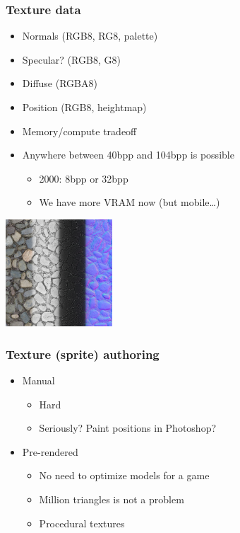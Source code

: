 \documentclass{beamer}
\begin{document}
\begin{frame}\frametitle{Texture data}

\begin{itemize}
\item
  Normals (RGB8, RG8, palette)
\item
  Specular? (RGB8, G8)
\item
  Diffuse (RGBA8)
\item
  Position (RGB8, heightmap)
\item
  Memory/compute tradeoff
\item
  Anywhere between 40bpp and 104bpp is possible

  \begin{itemize}
  \item
    2000: 8bpp or 32bpp
  \item
    We have more VRAM now (but mobile\ldots{})
  \end{itemize}
\end{itemize}
\begin{center}
\includegraphics[width=0.3\textwidth]{maps.jpg}
\end{center}

\end{frame}

\begin{frame}\frametitle{Texture (sprite) authoring}

\begin{itemize}
\item
  Manual

  \begin{itemize}
  \item
    Hard
  \item
    Seriously? Paint positions in Photoshop?
  \end{itemize}
\item
  Pre-rendered

  \begin{itemize}
  \item
    No need to optimize models for a game
  \item
    Million triangles is not a problem
  \item
    Procedural textures
  \end{itemize}
\end{itemize}

\end{frame}
\end{document}
